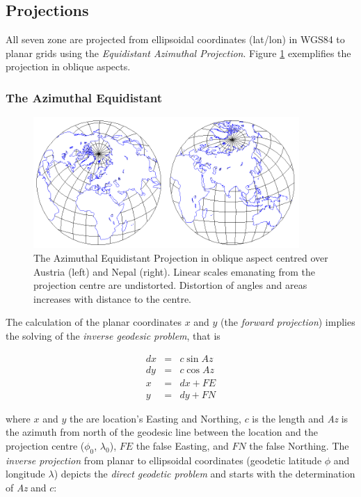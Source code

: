 \documentclass[10pt,a4paper]{article}
\begin{document}
\newpage

\subsection{Projections}
\label{sub:projections}

All seven zone are projected from ellipsoidal coordinates (lat/lon) in WGS84 to planar grids using the \textit{Equidistant Azimuthal Projection}. Figure \ref{fig:equi_azi} exemplifies the projection in oblique aspects. 

\subsubsection{The Azimuthal Equidistant}

\begin{figure}[hbtp]
\centering
\includegraphics[width=0.9\textwidth]{equi_azi}
\caption{
The Azimuthal Equidistant Projection in oblique aspect centred over Austria (left) and Nepal (right). Linear scales emanating from the projection centre are undistorted. Distortion of angles and areas increases with distance to the centre.
}
\label{fig:equi_azi}
\end{figure}

The calculation of the planar coordinates $x$ and $y$ (the \textit{forward projection}) implies the solving of the \textit{inverse geodesic problem}, that is

\begin{eqnarray}
dx &=& c \sin Az \\ 
dy &=& c \cos Az \\
x &=& dx + FE \\
y &=& dy + FN
\end{eqnarray}

where $x$ and $y$ the are location's Easting and Northing, $c$ is the length and \textit{Az} is the azimuth from north of the geodesic line between the location and the projection centre ($\phi_{0}$, $\lambda_{0}$), $FE$ the false Easting, and $FN$ the false Northing. The \textit{inverse projection} from planar to ellipsoidal coordinates (geodetic latitude $\phi$ and longitude $\lambda$) depicts the \textit{direct geodetic problem} and starts with the determination of \textit{Az} and $c$:
\end{document}
